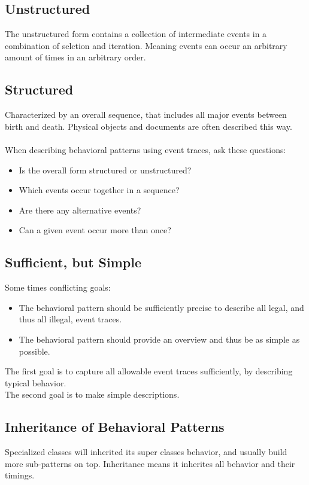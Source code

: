 \subsection*{Unstructured}
The unstructured form contains a collection of intermediate events in a combination of selction and iteration. Meaning events can occur an arbitrary amount of times in an arbitrary order.

\subsection*{Structured}
Characterized by an overall sequence, that includes all major events between birth and death. Physical objects and documents are often described this way.
\\\\
When describing behavioral patterns using event traces, ask these questions:
\begin{itemize}
    \item Is the overall form structured or unstructured?
    \item Which events occur together in a sequence?
    \item Are there any alternative events?
    \item Can a given event occur more than once?
\end{itemize}

\subsection*{Sufficient, but Simple \ooad[100]}
Some times conflicting goals:
\begin{itemize}
    \item The behavioral pattern should be sufficiently precise to describe all legal, and thus all illegal, event traces.
    \item The behavioral pattern should provide an overview and thus be as simple as possible.
\end{itemize}
The first goal is to capture all allowable event traces sufficiently, by describing typical behavior.\\
The second goal is to make simple descriptions.
\subsection*{Inheritance of Behavioral Patterns \ooad[102]}
Specialized classes will inherited its super classes behavior, and usually build more sub-patterns on top. Inheritance means it inherites all behavior and their timings.

